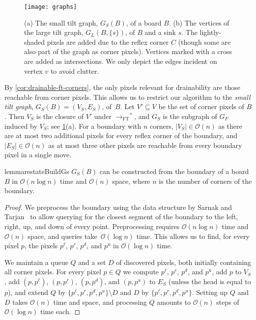 \documentclass[a4paper,UKenglish,cleveref,thm-restate]{lipics-v2021}
\newcommand{\FT}{\ensuremath{\mathrm{FT}}\xspace}
\newcommand{\rOne}[1][M]{\ensuremath{\rightarrow_{#1}}}
\newcommand{\rStar}[1][M]{\rOne[#1]^*}
\newcommand{\BigO}{\mathcal{O}}
\begin{document}
\begin{figure}[htb]
    \centering
    \texttt{[image: graphs]}\caption{(a) The small tilt graph, $G_S(B)$, of a board $B$. (b) The vertices of the large
    tilt graph, $G_L(B, \{s\})$, of $B$ and a sink $s$. The lightly-shaded pixels are added due to
    the reflex corner $C$ (though some are also part of the graph as corner
    pixels). Vertices marked with a cross are added as intersections. We only depict the
    edges incident on vertex $v$ to avoid clutter.}\label{fig:graphs}
\end{figure}

By \cref{cor:drainable-ft-corners}, the only pixels relevant for drainability are those
reachable from corner pixels. This allows us to restrict our algorithm to the \emph{small tilt graph},
$G_S(B)=(V_S, E_S)$, of~$B$. Let $V' \subseteq V$ be the set of corner pixels of
$B$. Then $V_S$ is the closure of $V'$ under $\rStar[\FT]$, and $G_S$ is the
subgraph of $G_F$ induced by $V_S$; see \cref{fig:graphs}(a).
For a boundary with $n$ corners, $|V_S| \in \BigO(n)$ as there are
at most two additional pixels for every reflex corner of the boundary, and
$|E_S| \in \BigO(n)$ as at most three other pixels are reachable from every
boundary pixel in a single move.

\begin{restatable}{lemma}{restateBuildGs}
    \label{lem:build-gs}
    $G_S(B)$ can be constructed from the boundary of a board $B$ in $\BigO(n \log n)$
    time and $\BigO(n)$ space, where $n$ is the number of corners of the boundary.
\end{restatable}
\begin{proof}
    We preprocess the boundary using the data structure by Sarnak and
    Tarjan~\cite{st-planar1986} to allow querying for the closest segment of the
    boundary to the left, right, up, and down of every point. Preprocessing requires
    $\BigO(n \log n)$ time and $\BigO(n)$ space, and queries take~$\BigO(\log n)$ time. This
    allows us to find, for every pixel $p$, the pixels $p^{\ell}$, $p^r$, $p^d$, and
    $p^u$ in $\BigO(\log n)$ time.

    We maintain a queue $Q$ and a set $D$ of discovered pixels, both initially
    containing all corner pixels. For every pixel $p \in Q$ we compute
    $p^{\ell}$, $p^r$, $p^d$, and $p^u$, add $p$ to $V_S$, add $(p, p^{\ell})$,
    $(p, p^r)$, $(p, p^d)$, and $(p, p^u)$ to $E_S$ (unless the head is equal to
    $p$), and extend $Q$ by \(\{p^{\ell}, p^r, p^d, p^u\} \setminus D\) and $D$ by
    \(\{p^{\ell}, p^r, p^d, p^u\}\). Setting up $Q$ and $D$ takes $\BigO(n)$ time and
    space, and processing $Q$ amounts to $\BigO(n)$ steps of $\BigO(\log n)$ time each.
\end{proof}
\end{document}

